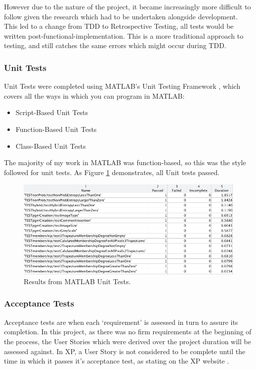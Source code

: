 However due to the nature of the project, it became increasingly more difficult to follow given the research which had to be undertaken alongside development. This led to a change from \acrshort{TDD} to Retrospective Testing, all tests would be written post-functional-implementation. This is a more traditional approach to testing, and still catches the same errors which might occur during \acrshort{TDD}.

\subsubsection{Unit Tests}

Unit Tests were completed using MATLAB's Unit Testing Framework \cite{testing}, which covers all the ways in which you can program in MATLAB:

\begin{itemize}
  \item Script-Based Unit Tests
  \item Function-Based Unit Tests
  \item Class-Based Unit Tests
  \end{itemize}

The majority of my work in MATLAB was function-based, so this was the style followed for unit tests. As Figure \ref{fig:unit-test-results} demonstrates, all Unit tests passed.

\begin{figure}[H]
  \centering
  \includegraphics[width=\textwidth]{Chapter2/software-img/test-results.png}
  \caption{Results from MATLAB Unit Tests.}
  \label{fig:unit-test-results}
\end{figure}

\subsubsection{Acceptance Tests}

Acceptance tests are when each `requirement' is assessed in turn to assure its completion. In this project, as there was no firm requirements at the beginning of the process, the User Stories which were derived over the project duration will be assessed against. In \acrfull{XP}, a User Story is not considered to be complete until the time in which it passes it's acceptance test, as stating on the \acrshort{XP} website \cite{Acceptance_Tests}.

